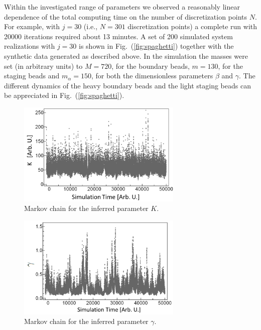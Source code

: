 \documentclass[12pt,a4paper,final]{iopart}
\begin{document}
Within the investigated range of parameters we observed a reasonably linear dependence of the total computing time on the number of discretization points $N$. For example, with $j=30$ (i.e., $N = 301$ discretization points) a complete run with 20000 iterations required about 13 minutes. A set of 200 simulated system realizations with $j=30$ is shown in Fig.~(\ref{fig:spaghetti}) together with the synthetic data generated as described above. In the simulation the masses were set (in arbitrary units) to $M=720$, for the boundary beads, $m=130$, for the staging beads and $m_\alpha=150$, for both the dimensionless parameters $\beta$ and $\gamma$. The different dynamics of the heavy boundary beads and the light staging beads can be appreciated in Fig.~(\ref{fig:spaghetti}).
%
\begin{figure}[htb!]
    \centering
    \includegraphics[width=0.7\textwidth]{Figs/FigChainK.png}
    \caption{Markov chain for the inferred parameter $K$.}
    \label{fig:chainK}
\end{figure}
%
\begin{figure}[htb!]
    \centering
    \includegraphics[width=0.7\textwidth]{Figs/FigChainG.png}
    \caption{Markov chain for the inferred parameter $\gamma$.}
    \label{fig:chainG}
\end{figure}
\end{document}
